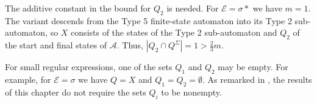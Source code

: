 The additive constant in the bound for $Q_2$ is needed. For $\mathcal{E} = \sigma*$
we have $m = 1$. The variant descends from the Type 5 finite-state automaton into its
Type 2 sub-automaton, so $X$ consists of the states of the Type 2 sub-automaton and
$Q_2$ of the start and final states of $\mathcal{A}$. Thus, $|Q_2 \cap Q^\Sigma| = 1 >
\frac{2}{3} m$.

For small regular expressions, one of the sets $Q_1$ and $Q_2$ may be empty. For
example, for $\mathcal{E} = \sigma$ we have $Q = X$ and $Q_1 = Q_2 = \emptyset$. As
remarked in , the results of this chapter
do not require the sets $Q_i$ to be nonempty.
